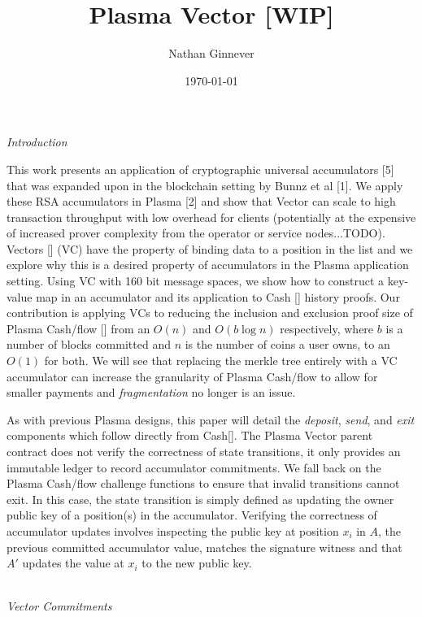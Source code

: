 \documentclass[11pt]{article}
\title{Plasma Vector [WIP]}
\author{Nathan Ginnever}
\date{\today}
\begin{document}
\maketitle
\centerline{\textit{Introduction}}

This work presents an application of cryptographic universal accumulators [5] that was expanded upon in the blockchain setting by Bunnz et al [1]. We apply these RSA accumulators in Plasma [2] and show that Vector can scale to high transaction throughput with low overhead for clients (potentially at the expensive of increased prover complexity from the operator or service nodes...TODO). Vectors [] (VC) have the property of binding data to a position in the list and we explore why this is a desired property of accumulators in the Plasma application setting. Using VC with 160 bit message spaces, we show how to construct a key-value map in an accumulator and its application to Cash [] history proofs. Our contribution is applying VCs to reducing the inclusion and exclusion proof size of Plasma Cash/flow [] from an $O(n)$ and $O(b \log n)$ respectively, where $b$ is a number of blocks committed and $n$ is the number of coins a user owns, to an $O(1)$ for both. We will see that replacing the merkle tree entirely with a VC accumulator can increase the granularity of Plasma Cash/flow to allow for smaller payments and \textit{fragmentation} no longer is an issue.

As with previous Plasma designs, this paper will detail the \textit{deposit}, \textit{send}, and \textit{exit} components which follow directly from Cash[]. The Plasma Vector parent contract does not verify the correctness of state transitions, it only provides an immutable ledger to record accumulator commitments. We fall back on the Plasma Cash/flow challenge functions to ensure that invalid transitions cannot exit. In this case, the state transition is simply defined as updating the owner public key of a position(s) in the accumulator. Verifying the correctness of accumulator updates involves inspecting the public key at position $x_i$ in $A$, the previous committed accumulator value, matches the signature witness and that $A'$ updates the value at $x_i$ to the new public key. 
\\
\\

\centerline{\textit{Vector Commitments}}
\end{document}
